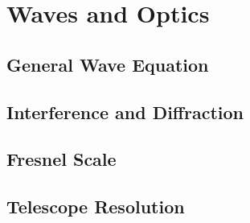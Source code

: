 \chapter{Waves and Optics}

\section{General Wave Equation}


\section{Interference and Diffraction}
\TODO

\section{Fresnel Scale}


\section{Telescope Resolution}

